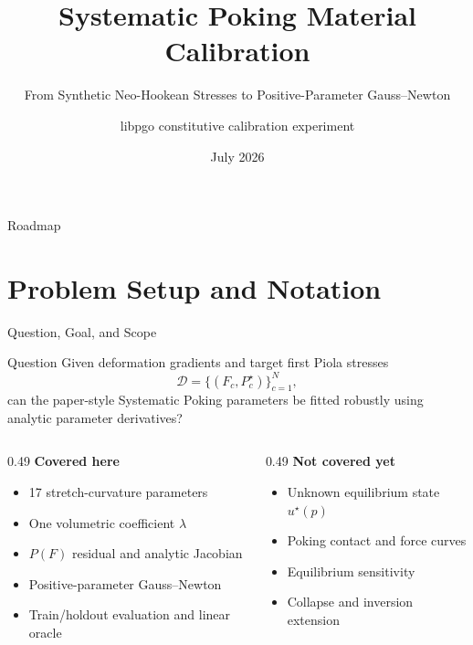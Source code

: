 \documentclass[aspectratio=169,10pt]{beamer}
\title[Systematic Poking Calibration]{Systematic Poking Material Calibration}
\subtitle{From Synthetic Neo-Hookean Stresses to Positive-Parameter Gauss--Newton}
\author{libpgo constitutive calibration experiment}
\date{July 2026}
\begin{document}
\begin{frame}
  \titlepage
\end{frame}

\begin{frame}{Roadmap}
  \tableofcontents[hideallsubsections]
\end{frame}

\section{Problem Setup and Notation}

\begin{frame}{Question, Goal, and Scope}
  \begin{block}{Question}
    Given deformation gradients and target first Piola stresses
    \[
      \mathcal D=\{(F_c,P_c^{\star})\}_{c=1}^{N},
    \]
    can the paper-style Systematic Poking parameters be fitted robustly using
    analytic parameter derivatives?
  \end{block}

  \vspace{0.4em}
  \begin{columns}[T]
    \begin{column}{0.49\linewidth}
      \textbf{Covered here}
      \begin{itemize}
        \item 17 stretch-curvature parameters
        \item One volumetric coefficient $\lambda$
        \item $P(F)$ residual and analytic Jacobian
        \item Positive-parameter Gauss--Newton
        \item Train/holdout evaluation and linear oracle
      \end{itemize}
    \end{column}
    \begin{column}{0.49\linewidth}
      \textbf{Not covered yet}
      \begin{itemize}
        \item Unknown equilibrium state $u^\star(p)$
        \item Poking contact and force curves
        \item Equilibrium sensitivity
        \item Collapse and inversion extension
      \end{itemize}
    \end{column}
  \end{columns}
\end{frame}
\end{document}
